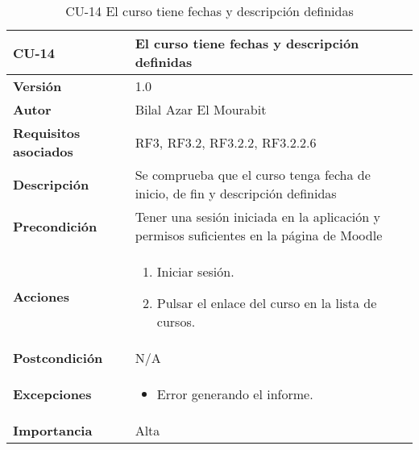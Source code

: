 \begin{table}[H]
	\centering
	\begin{tabularx}{\linewidth}{ p{} p{} }
		\toprule
		\textbf{CU-14}    & \textbf{El curso tiene fechas y descripción definidas}\\
		\toprule
		\textbf{Versión}              & 1.0    \\
		\textbf{Autor}                & Bilal Azar El Mourabit \\
		\textbf{Requisitos asociados} & RF3, RF3.2, RF3.2.2, RF3.2.2.6 \\
		\textbf{Descripción}          & Se comprueba que el curso tenga fecha de inicio, de fin y descripción definidas\\
    		\textbf{Precondición}         & Tener una sesión iniciada en la aplicación y permisos suficientes en la página de Moodle \\
		\textbf{Acciones}             & 
		\begin{enumerate}
			\def\labelenumi{\arabic{enumi}.}
			\tightlist
			\item Iniciar sesión.
            \item Pulsar el enlace del curso en la lista de cursos. 
		\end{enumerate}\\
		\textbf{Postcondición}        & N/A \\
		\textbf{Excepciones}          & \begin{itemize}
		    \item Error generando el informe.
		\end{itemize} \\
		\textbf{Importancia}          & Alta \\
		\bottomrule
	\end{tabularx}
	\caption{CU-14 El curso tiene fechas y descripción definidas}
\end{table}

